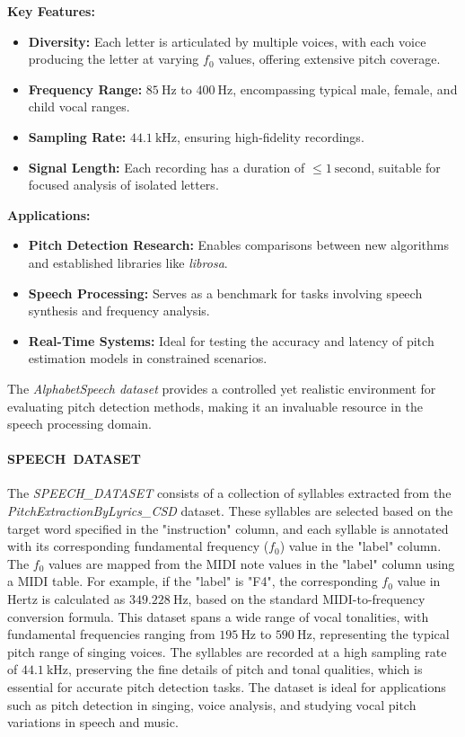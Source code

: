 \documentclass{ieeeaccess}
\begin{document}
\textbf{Key Features:}
\begin{itemize}
    \item \textbf{Diversity:} Each letter is articulated by multiple voices, with each voice producing the letter at varying \( f_0 \) values, offering extensive pitch coverage.
    \item \textbf{Frequency Range:} \( 85 \ \text{Hz} \) to \( 400 \ \text{Hz} \), encompassing typical male, female, and child vocal ranges.
    \item \textbf{Sampling Rate:} \( 44.1 \ \text{kHz} \), ensuring high-fidelity recordings.
    \item \textbf{Signal Length:} Each recording has a duration of \( \leq 1 \ \text{second} \), suitable for focused analysis of isolated letters.
\end{itemize}

\textbf{Applications:}
\begin{itemize}
    \item \textbf{Pitch Detection Research:} Enables comparisons between new algorithms and established libraries like \textit{librosa}.
    \item \textbf{Speech Processing:} Serves as a benchmark for tasks involving speech synthesis and frequency analysis.
    \item \textbf{Real-Time Systems:} Ideal for testing the accuracy and latency of pitch estimation models in constrained scenarios.
\end{itemize}

The \textit{AlphabetSpeech dataset} provides a controlled yet realistic environment for evaluating pitch detection methods, making it an invaluable resource in the speech processing domain.

\paragraph{SPEECH\ DATASET}
The \textit{SPEECH\_DATASET} consists of a collection of syllables extracted from the \textit{PitchExtractionByLyrics\_CSD} dataset. These syllables are selected based on the target word specified in the "instruction" column, and each syllable is annotated with its corresponding fundamental frequency (\( f_0 \)) value in the "label" column. The \( f_0 \) values are mapped from the MIDI note values in the "label" column using a MIDI table. For example, if the "label" is "F4", the corresponding \( f_0 \) value in Hertz is calculated as \( 349.228 \ \text{Hz} \), based on the standard MIDI-to-frequency conversion formula. This dataset spans a wide range of vocal tonalities, with fundamental frequencies ranging from \( 195 \ \text{Hz} \) to \( 590 \ \text{Hz} \), representing the typical pitch range of singing voices. The syllables are recorded at a high sampling rate of \( 44.1 \ \text{kHz} \), preserving the fine details of pitch and tonal qualities, which is essential for accurate pitch detection tasks. The dataset is ideal for applications such as pitch detection in singing, voice analysis, and studying vocal pitch variations in speech and music.
\end{document}
